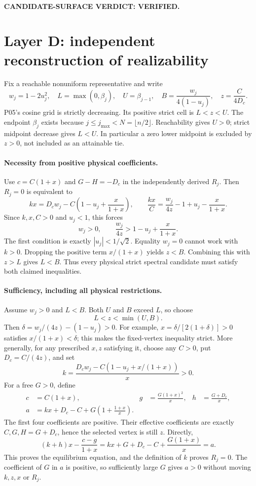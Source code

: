 \documentclass[11pt]{article}
\begin{document}
\noindent\textbf{CANDIDATE-SURFACE VERDICT: VERIFIED.}

\section{Layer D: independent reconstruction of realizability}
\label{sec:D}
Fix a reachable nonuniform representative and write
\[
 w_j=1-2u_j^2,\quad
 L=\max(0,\beta_j),\quad U=\beta_{j-1},\quad
 B=\frac{w_j}{4(1-u_j)},\quad z=\frac{C}{4D_c}.
\]
P05's cosine grid is strictly decreasing. Its positive strict cell is
$L<z<U$. The endpoint $\beta_j$ exists because
$j\le j_{\max}<N=\lfloor n/2\rfloor$. Reachability gives $U>0$;
strict midpoint decrease gives $L<U$. In particular a zero lower midpoint
is excluded by $z>0$, not included as an attainable tie.

\paragraph{Necessity from positive physical coefficients.}
Use $c=C(1+x)$ and $G-H=-D_c$ in the independently derived $R_j$.
Then $R_j=0$ is equivalent to
\[
 kx=D_cw_j-C\left(1-u_j+\frac{x}{1+x}\right),\qquad
 \frac{kx}{C}=\frac{w_j}{4z}-1+u_j-\frac{x}{1+x}.
\]
Since $k,x,C>0$ and $u_j<1$, this forces
\[
 w_j>0,\qquad \frac{w_j}{4z}>1-u_j+\frac{x}{1+x}.
\]
The first condition is exactly $|u_j|<1/\sqrt2$. Equality $w_j=0$
cannot work with $k>0$. Dropping the positive term $x/(1+x)$ yields
$z<B$. Combining this with $z>L$ gives $L<B$. Thus every physical
strict spectral candidate must satisfy both claimed inequalities.

\paragraph{Sufficiency, including all physical restrictions.}
Assume $w_j>0$ and $L<B$. Both $U$ and $B$ exceed $L$, so choose
\[
 L<z<\min(U,B).
\]
Then $\delta=w_j/(4z)-(1-u_j)>0$. For example,
$x=\delta/[2(1+\delta)]>0$ satisfies $x/(1+x)<\delta$;
this makes the fixed-vertex inequality strict. More generally, for any
prescribed $x,z$ satisfying it, choose any $C>0$, put $D_c=C/(4z)$,
and set
\[
 k=\frac{D_cw_j-C(1-u_j+x/(1+x))}{x}>0.
\]
For a free $G>0$, define
\begin{align*}
 c&=C(1+x),&g&=\frac{G(1+x)^2}{x},&h&=\frac{G+D_c}{x},\\
 a&=kx+D_c-C+G\left(1+\frac{1+x}{x}\right).
\end{align*}
The first four coefficients are positive. Their effective coefficients
are exactly $C,G,H=G+D_c$, hence the selected vertex is still $z$.
Directly,
\[
 (k+h)x-\frac{c-g}{1+x}
 =kx+G+D_c-C+\frac{G(1+x)}x=a.
\]
This proves the equilibrium equation, and the definition of $k$ proves
$R_j=0$. The coefficient of $G$ in $a$ is positive, so sufficiently
large $G$ gives $a>0$ without moving $k,z,x$ or $R_j$.
\end{document}
